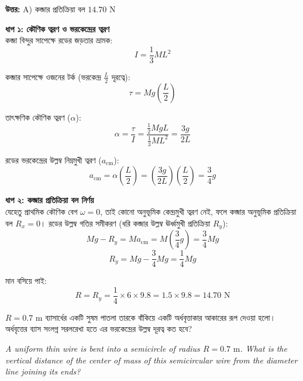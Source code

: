 \documentclass[12pt, a4paper]{article}
\begin{document}
\vspace{0.5em}
\begin{tcolorbox}[answerbox]
    \textbf{\color{success} উত্তর:} A) কব্জার প্রতিক্রিয়া বল $14.70\text{ N}$
\end{tcolorbox}
\vspace{1em}

\begin{tcolorbox}[solutionbox={সমাধান (Solution)}]
    \noindent
    \textbf{ধাপ ১: কৌণিক ত্বরণ ও ভরকেন্দ্রের ত্বরণ} \\
    কব্জা বিন্দুর সাপেক্ষে রডের জড়তার ভ্রামক:
    \[ I = \frac{1}{3} M L^2 \]
    
    কব্জার সাপেক্ষে ওজনের টর্ক (ভরকেন্দ্র $\frac{L}{2}$ দূরত্বে):
    \[ \tau = M g \left(\frac{L}{2}\right) \]
    
    তাৎক্ষণিক কৌণিক ত্বরণ ($\alpha$):
    \[ \alpha = \frac{\tau}{I} = \frac{\frac{1}{2} M g L}{\frac{1}{3} M L^2} = \frac{3g}{2L} \]
    
    রডের ভরকেন্দ্রের উল্লম্ব নিম্নমুখী ত্বরণ ($a_{\text{cm}}$):
    \[ a_{\text{cm}} = \alpha \left(\frac{L}{2}\right) = \left(\frac{3g}{2L}\right) \left(\frac{L}{2}\right) = \frac{3}{4} g \]
    
    \vspace{0.5em}
    \noindent\textbf{ধাপ ২: কব্জার প্রতিক্রিয়া বল নির্ণয়} \\
    যেহেতু প্রাথমিক কৌণিক বেগ $\omega = 0$, তাই কোনো অনুভূমিক কেন্দ্রমুখী ত্বরণ নেই, ফলে কব্জার অনুভূমিক প্রতিক্রিয়া বল $R_x = 0$। 
    রডের উল্লম্ব গতির সমীকরণ (ধরি কব্জার উল্লম্ব ঊর্ধ্বমুখী প্রতিক্রিয়া $R_y$):
    \[ M g - R_y = M a_{\text{cm}} = M \left(\frac{3}{4} g\right) = \frac{3}{4} M g \]
    \[ R_y = M g - \frac{3}{4} M g = \frac{1}{4} M g \]
    
    মান বসিয়ে পাই:
    \[ R = R_y = \frac{1}{4} \times 6 \times 9.8 = 1.5 \times 9.8 = \mathbf{14.70}\text{ N} \]
\end{tcolorbox}

\begin{tcolorbox}[questionbox={প্রশ্ন (Question) 30}]
    \noindent
    $R = 0.7\text{ m}$ ব্যাসার্ধের একটি সুষম পাতলা তারকে বাঁকিয়ে একটি অর্ধবৃত্তাকার আকারের রূপ দেওয়া হলো। অর্ধবৃত্তের ব্যাস সংলগ্ন সরলরেখা হতে এর ভরকেন্দ্রের উল্লম্ব দূরত্ব কত হবে?
    
    \vspace{0.8em}
    \begin{english}
    \noindent\textit{\color{darkgray}
    A uniform thin wire is bent into a semicircle of radius $R = 0.7\text{ m}$. What is the vertical distance of the center of mass of this semicircular wire from the diameter line joining its ends?
    }
    \end{english}
\end{tcolorbox}
\end{document}

